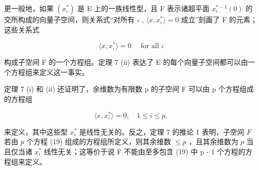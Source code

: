 更一般地，如果 \((x_{\iota}^{*})\) 是 E 上的一族线性型，且 F 表示诸超平面 \(x_{\iota}^{*-1}(0)\) 的交所构成的向量子空间，则关系式“对所有 \(\iota\) , \(\langle x, x_{\iota}^{*}\rangle = 0\) 成立”刻画了 F 的元素；这些关系式

\[
\langle x, x _ {\iota} ^ {*} \rangle = 0 \quad \text { for   all } \iota
\]

构成子空间 F 的一个方程组。定理 7 (ii) 表达了 E 的每个向量子空间都可以由一个方程组来定义这一事实。

定理 7 (i) 和 (ii) 还证明了，余维数为有限数 p 的子空间 F 可以由 p 个方程组成的方程组

\[
\langle x, x _ {i} ^ {*} \rangle = 0, \quad 1 \leqslant i \leqslant p,\tag{19}
\]

来定义，其中这些型 \(x_{i}^{*}\) 是线性无关的。反之，定理 7 的推论 1 表明，子空间 \(F\) 若由 \(p\) 个方程 (19) 组成的方程组所定义，则其余维数 \(\leqslant p\) ，且其余维数为 \(p\) 当且仅当诸 \(x_{i}^{*}\) 线性无关；这等价于说 F 不能由至多包含 (19) 中 p - 1 个方程的方程组来定义。

